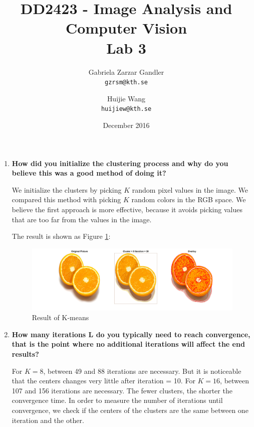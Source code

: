 \documentclass{article}
\title{DD2423 - Image Analysis and Computer Vision\\
  \large Lab 3}
\author{
  Gabriela Zarzar Gandler\\
  \texttt{gzrsm@kth.se}
  \and
 Huijie Wang\\
  \texttt{huijiew@kth.se}
}
\date{December 2016}
\begin{document}
\maketitle

\begin{enumerate}
\addtocounter{section}{1}
\section{K-means clustering}
    
    
    \item %
    \textbf{How did you initialize the clustering process and why do you believe this was a good method of doing it?}
    \par
    
    We initialize the clusters by picking $K$ random pixel values in the image. We compared this method with picking $K$ random colors in the RGB space. We believe the first approach is more effective, because it avoids picking values that are too far from the values in the image.
    
    The result is shown as Figure \ref{fig:q1}:
    \begin{figure}[H]
        \centering
        \includegraphics[width=\linewidth]{kmeans_r.png}
        \caption{Result of K-means}
        \label{fig:q1}
    \end{figure}
    \par
    
    \item %
    \textbf{How many iterations L do you typically need to reach convergence, that is the point where no additional iterations will affect the end results?}
    \par
    For $K = 8$, between 49 and 88 iterations are necessary. But it is noticeable that the centers changes very little after iteration = 10. For $K = 16$, between 107 and 156 iterations are necessary. The fewer clusters, the shorter the convergence time. In order to measure the number of iterations until convergence, we check if the centers of the clusters are the same between one iteration and the other.


\end{enumerate}
\end{document}

